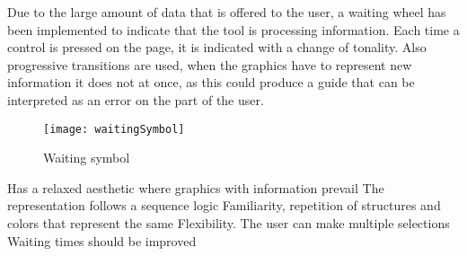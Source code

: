     Due to the large amount of data that is offered to the user, a waiting wheel has been implemented to indicate
    that the tool is processing information. Each time a control is pressed on the page, it is indicated with a change
    of tonality. Also progressive transitions are used, when the graphics have to represent new information it does not
    at once, as this could produce a guide that can be interpreted as an error on the part of the user.
    
    \begin{figure}[ht]
        \centering
        \texttt{[image: waitingSymbol]}
        \caption{Waiting symbol}
    \end{figure}  





\begin{itemize}
    \done Has a relaxed aesthetic where graphics with information prevail
   \done The representation follows a sequence logic
    \done Familiarity, repetition of structures and colors that represent the same
    \done Flexibility. The user can make multiple selections
    \crossed Waiting times should be improved
    
\end{itemize}
\newpage